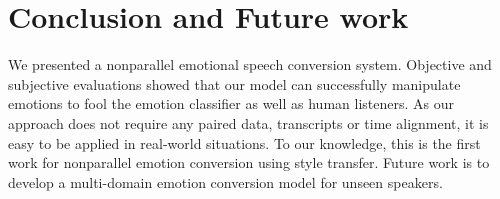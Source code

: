 \documentclass{article}
\begin{document}





\section{Conclusion and Future work}
\label{sec:con}
We presented a nonparallel emotional speech conversion system. Objective and subjective evaluations showed that our model can successfully manipulate emotions to fool the emotion classifier as well as human listeners. As our approach does not require any paired data, transcripts or time alignment, it is easy to be applied in real-world situations. To our knowledge, this is the first work for nonparallel emotion conversion using style transfer. Future work is to develop a multi-domain emotion conversion model for unseen speakers.
\end{document}
